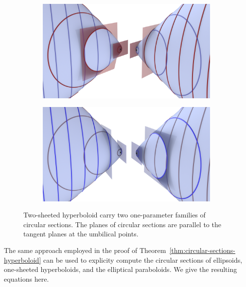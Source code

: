 \documentclass[10pt, a4paper]{article}
\theoremstyle{BoldTopSpacing}
\theoremstyle{BoldTopSpacing}
\theoremstyle{BoldTopSpacing}
\theoremstyle{BoldTopBottomSpacing}
\theoremstyle{BoldTopSpacing}
\theoremstyle{BoldTopBottomSpacing}
\theoremstyle{remark}
\begin{document}
\begin{figure}[H]
  \begin{subfigure}[b]{0.5\textwidth}
    \includegraphics[width=\textwidth]{umbilics_two_sheeted_hyperboloid_red.png}
    \label{fig:two_sheeted_red}
  \end{subfigure}
  \hfill
  \begin{subfigure}[b]{0.5\textwidth}
    \includegraphics[width=\textwidth]{umbilics_two_sheeted_hyperboloid_blue.png}
    \label{fig:two_sheeted_blue}
  \end{subfigure}
  \caption{Two-sheeted hyperboloid carry two one-parameter families of circular sections. The planes of circular sections are parallel to the tangent planes at the umbilical points.}
\end{figure}

The same approach employed in the proof of Theorem~\ref{thm:circular-sections-hyperboloid} can be used to explicity compute the circular sections of ellipsoids, one-sheeted hyperboloids, and the elliptical paraboloids. We give the resulting equations here. \par
\end{document}
